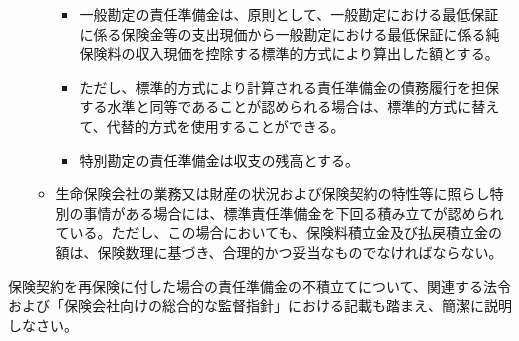 \documentclass[report,gutter=10mm,fore-edge=10mm,uplatex,dvipdfmx]{jlreq}
\begin{document}
\begin{itemize}
\begin{itemize}
    \begin{itemize}
    \tightlist
    \item
      一般勘定の責任準備金は、原則として、一般勘定における最低保証に係る保険金等の支出現価から一般勘定における最低保証に係る純保険料の収入現価を控除する標準的方式により算出した額とする。
    \item
      ただし、標準的方式により計算される責任準備金の債務履行を担保する水準と同等であることが認められる場合は、標準的方式に替えて、代替的方式を使用することができる。
    \item
      特別勘定の責任準備金は収支の残高とする。
    \end{itemize}
  \item
    生命保険会社の業務又は財産の状況および保険契約の特性等に照らし特別の事情がある場合には、標準責任準備金を下回る積み立てが認められている。ただし、この場合においても、保険料積立金及び払戻積立金の額は、保険数理に基づき、合理的かつ妥当なものでなければならない。
  \end{itemize}
\end{itemize}


保険契約を再保険に付した場合の責任準備金の不積立てについて、関連する法令および「保険会社向けの総合的な監督指針」における記載も踏まえ、簡潔に説明しなさい。

\end{document}
